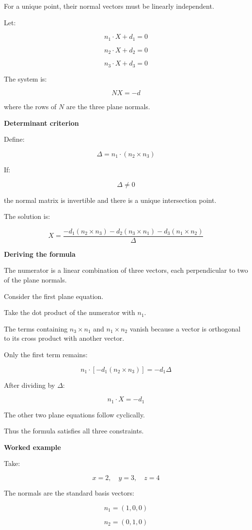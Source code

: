 For a unique point, their normal vectors must be linearly independent.

Let:

\[
n_1\cdot X+d_1=0
\]

\[
n_2\cdot X+d_2=0
\]

\[
n_3\cdot X+d_3=0
\]

The system is:

\[
NX=-d
\]

where the rows of \(N\) are the three plane normals.

\textbf{Determinant criterion}

Define:

\[
\boxed{ \Delta=n_1\cdot(n_2\times n_3) }
\]

If:

\[
\Delta\ne0
\]

the normal matrix is invertible and there is a unique intersection point.

The solution is:

\[
\boxed{ X= \frac{ -d_1(n_2\times n_3) -d_2(n_3\times n_1) -d_3(n_1\times n_2) }{ \Delta } }
\]

\textbf{Deriving the formula}

The numerator is a linear combination of three vectors, each perpendicular to two of the plane normals.

Consider the first plane equation.

Take the dot product of the numerator with \(n_1\).

The terms containing \(n_3\times n_1\) and \(n_1\times n_2\) vanish because a vector is orthogonal to its cross product with another vector.

Only the first term remains:

\[
n_1\cdot[-d_1(n_2\times n_3)] =-d_1\Delta
\]

After dividing by \(\Delta\):

\[
n_1\cdot X=-d_1
\]

The other two plane equations follow cyclically.

Thus the formula satisfies all three constraints.

\textbf{Worked example}

Take:

\[
x=2,\quad y=3,\quad z=4
\]

The normals are the standard basis vectors:

\[
n_1=(1,0,0)
\]

\[
n_2=(0,1,0)
\]

